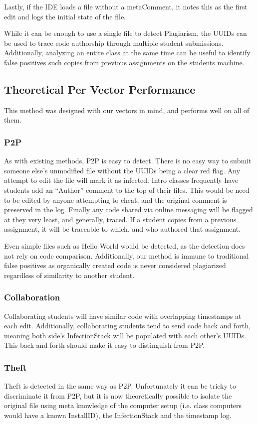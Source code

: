 \documentclass[letterpaper,10pt,conference]{IEEEtran}
\newcommand{\installID}{InstallID\xspace}
\newcommand{\metaComment}{metaComment\xspace}
\newcommand{\infectionStack}{InfectionStack\xspace}
\begin{document}
Lastly, if the IDE loads a file without a \metaComment, it notes this as the first edit and logs the initial state of the file.

While it can be enough to use a single file to detect Plagiarism, the UUIDs can be used to trace code authorship through multiple student submissions.  Additionally, analyzing an entire class at the same time can be useful to identify false positives such copies from previous assignments on the students machine.

\subsection{Theoretical Per Vector Performance}
This method was designed with our vectors in mind, and performs well on all of them.
\subsubsection{P2P}
		As with existing methods, P2P is easy to detect.  There is no easy way to submit someone else's unmodified file without the UUIDs being a clear red flag.  Any attempt to edit the file will mark it as infected.  Intro classes frequently have students add an ``Author'' comment to the top of their files.  This would be need to be edited by anyone attempting to cheat, and the original comment is preserved in the log. Finally any code shared via online messaging will be flagged at they very least, and generally, traced.   If a student copies from a previous assignment, it will be traceable to  which, and who authored that assignment.
		
		Even simple files such as Hello World would be detected, as the detection does not rely on code comparison. Additionally, our method is immune to traditional false positives as organically created code is never considered plagiarized regardless of similarity to another student.
	\subsubsection{Collaboration}
		Collaborating students will have similar code with overlapping timestamps at each edit.  Additionally, collaborating students tend to send code back and forth, meaning both side's \infectionStack will be populated with each other's UUIDs.  This back and forth should make it easy to distinguish from P2P.
	\subsubsection{Theft}
	Theft is detected in the same way as P2P.  Unfortunately it can be tricky to discriminate it from P2P, but it is now theoretically possible to isolate the original file using meta knowledge of the computer setup (i.e. class computers would have a known \installID), the \infectionStack and the timestamp log.  
\end{document}
